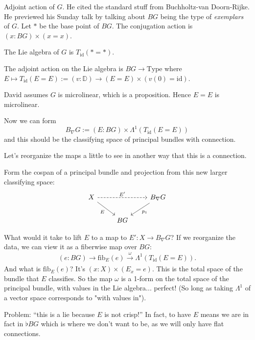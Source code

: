 \documentclass[17pt]{extarticle}
\begin{document}
Adjoint action of $G$. He cited the standard stuff from Buchholtz-van Doorn-Rijke. He previewed his Sunday talk by talking about $BG$ being the type of \emph{exemplars} of $G$. Let $*$ be the base point of $BG$. The conjugation action is $(x:BG)\times (x=x)$. 

The Lie algebra of $G$ is $T_\mathrm{id}(*=*)$.

The adjoint action on the Lie algebra is $BG\to\mathrm{Type}$ where $E\mapsto T_\mathrm{id}(E=E):= (v:\mathbb{D})\to (E=E)\times (v(0)=\mathrm{id})$.

David assumes $G$ is microlinear, which is a proposition. Hence $E=E$ is microlinear. 

Now we can form $$B_\nabla G:= (E:BG)\times\Lambda^1(T_\mathrm{id}(E=E))$$
and this should be the classifying space of principal bundles with connection.

Let's reorganize the maps a little to see in another way that this is a connection.

Form the cospan of a principal bundle and projection from this new larger classifying space:
\[\begin{tikzcd}
	X && {B_\nabla G} \\
	& BG
	\arrow["E"', from=1-1, to=2-2]
	\arrow["{p_1}", from=1-3, to=2-2]
	\arrow["{E'}", dashed, from=1-1, to=1-3]
\end{tikzcd}\]

What would it take to lift $E$ to a map to $E':X\to B_\nabla G$? If we reorganize the data, we can view it as a fiberwise map over $BG$: $$(e:BG)\to \mathrm{fib}_E(e)\xrightarrow[]{\omega} \Lambda^1(T_\mathrm{id}(E=E)).$$ And what is $\mathrm{fib}_E(e)$? It's $(x:X)\times(E_x=e)$.  This is the total space of the bundle that $E$ classifies. So the map $\omega$ is a 1-form on the total space of the principal bundle, with values in the Lie algebra... perfect! (So long as taking $\Lambda^1$ of a vector space corresponds to "with values in").

Problem: ``this is a lie because $E$ is not crisp!'' In fact, to have $E$ means we are in fact in $\flat BG$ which is where we don't want to be, as we will only have flat connections.

\end{document}
